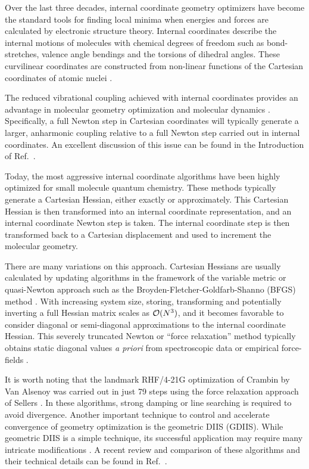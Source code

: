 \documentclass[prl,aps,preprint,showpacs,superbib]{revtex4}
\begin{document}
Over the last three decades, internal coordinate geometry optimizers have become the standard 
tools for finding local minima when energies and forces are calculated by electronic structure 
theory. Internal coordinates describe the internal motions of molecules 
with chemical degrees of freedom such as bond-stretches, valence angle bendings and the torsions 
of dihedral angles. These curvilinear coordinates are constructed from non-linear functions of the 
Cartesian coordinates of atomic nuclei \cite{wilson}.

The reduced vibrational coupling achieved with internal coordinates provides an advantage 
in molecular geometry optimization \cite{pulay_review} and molecular dynamics \cite{pulay_dynamics}.
Specifically, a full Newton step in Cartesian coordinates will typically generate a larger, 
anharmonic coupling relative to a full Newton step carried out in internal coordinates.
An excellent discussion of this issue can be found in the Introduction of Ref.~.

Today, the most aggressive internal coordinate algorithms have been highly optimized for 
small molecule quantum chemistry.  These methods typically generate a Cartesian Hessian,
either exactly or approximately. This Cartesian Hessian is then transformed into an internal 
coordinate representation, and an internal coordinate Newton step is taken. The internal 
coordinate step is then transformed back to a Cartesian displacement and used to increment the 
molecular geometry.

There are many variations on this approach.  Cartesian Hessians are usually calculated by updating 
algorithms in the framework of the variable metric or quasi-Newton approach such as the  
Broyden-Fletcher-Goldfarb-Shanno (BFGS) method \cite{RFletcher}.  With increasing system size, storing,
transforming and potentially inverting a full Hessian matrix scales as ${\cal O}(N^3)$, and it becomes
favorable to consider diagonal or semi-diagonal approximations to the internal coordinate Hessian. 
This severely truncated Newton or  ``force relaxation'' method typically obtains static diagonal values 
{\em a priori} from spectroscopic data or empirical force-fields 
\cite{pulay_69,fogarasi_diaghess,Pulay_natural_internals,pulay_review,sellers,van_alsenoy_98,lindh}.

It is worth noting that the landmark RHF/4-21G optimization of Crambin by Van Alsenoy \cite{van_alsenoy_98}
was carried out in just 79 steps using the force relaxation approach of Sellers \cite{sellers}.
In these algorithms, strong damping \cite{sellers} or line searching \cite{sclegel_linesearch}
is required to avoid divergence. Another important technique to control and accelerate convergence of 
geometry optimization is the geometric DIIS \cite{Pulay_GDIIS} (GDIIS). While geometric DIIS is a simple 
technique, its successful application may require many intricate modifications \cite{Farkas_GDIIS}.  A 
recent review and comparison of these algorithms and their technical details can be found in 
Ref.~.  
\end{document}
